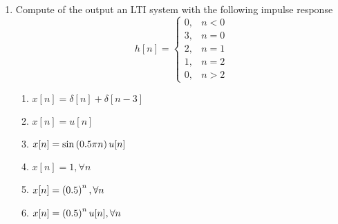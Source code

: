 \documentclass[12pt]{article}
\def\lp{\ensuremath\left(}
\def\rp{\ensuremath\right)}
\begin{document}
\begin{enumerate}
    \item Compute of the output an LTI system with the following impulse response
    \[ h[n] = \begin{cases} 0, & n < 0 \\ 3, & n = 0 \\ 2, & n = 1 \\ 1, & n = 2 \\ 0, & n > 2\end{cases}\] 
    \begin{enumerate}
        \item $x[n] = \delta[n] + \delta[n - 3]$ \newpage
        \item $x[n] = u[n]$ \newpage
        \item $x[n] = \sin\lp 0.5\pi n\rp u[n]$ \newpage
        \item $x[n] = 1, \forall n$ \newpage
        \item $x[n] = \lp 0.5 \rp^n, \forall n$ \newpage
        \item $x[n] = \lp 0.5 \rp^nu[n], \forall n$ \newpage
    \end{enumerate}
\end{enumerate}
\end{document}
